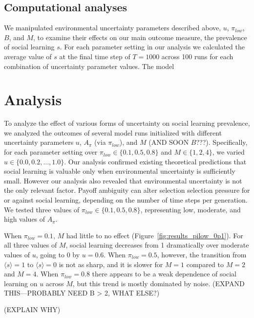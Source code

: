 \documentclass[letterpaper,11.5pt]{scrartcl}
\begin{document}
\subsection{Computational analyses}

We manipulated environmental uncertainty parameters described above, $u$,
$\pi_{low}$, $B$, and $M$, to examine their effects on our
main outcome measure, the prevalence of social learning $s$. For each parameter setting
in our analysis we calculated the average value of $s$ at the final time step
of $T=1000$ across 100 runs for each combination of uncertainty parameter values.
The model 



\section{Analysis}

To analyze the effect of various forms of uncertainty on social learning 
prevalence, we analyzed the outcomes of several model runs initialized with
different uncertainty parameters $u$, $A_\pi$ (via $\pi_{low}$), 
and $M$ (AND SOON $B$???). Specifically, for each parameter setting over
$\pi_{low} \in \{0.1, 0.5, 0.8\}$ and $M \in \{1, 2, 4\}$, we varied 
$u \in \{0.0, 0.2, \ldots, 1.0\}$.
Our analysis confirmed existing theoretical predictions that social learning
is valuable only when environmental uncertainty is sufficiently small. However
our analysis also revealed that environmental uncertainty is not the only 
relevant factor. Payoff ambiguity can alter selection selection pressure for or
against social learning, depending on the number of time steps per generation.
We tested three values of $\pi_{low} \in \{0.1, 0.5, 0.8\}$, representing
low, moderate, and high values of $A_\pi$. 

When $\pi_{low} = 0.1$, $M$ had little to no effect (Figure~\ref{fig:results_pilow_0p1}).
For all three values of $M$, social learning decreases from 1 dramatically over moderate
values of $u$, going to 0 by $u=0.6$. When $\pi_{low}=0.5$, however, the 
transition from $\langle s \rangle = 1$ to $\langle s \rangle = 0$ is not as
sharp, and it is slower for $M=1$ compared to $M=2$ and $M=4$. When $\pi_{low} = 0.8$
there appears to be a weak dependence of social learning on $u$ across $M$,
but this trend is mostly dominated by noise.
(EXPAND THIS---PROBABLY NEED B > 2, WHAT ELSE?)

(EXPLAIN WHY)
\end{document}
